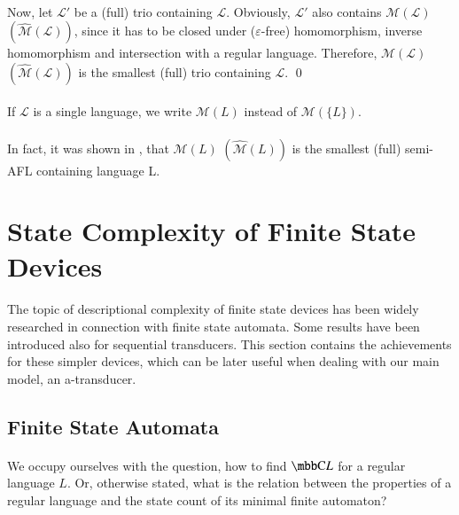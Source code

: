 \paragraph{}
Now, let $\mathcal{L'} $ be a (full) trio containing $\mathcal{L} $. Obviously, $\mathcal{L'} $ also contains $\mathcal{M(L)} $ $(\mathcal{\hat{M}(L)}) $, since it has to be closed under ($\varepsilon $-free) homomorphism, inverse homomorphism and intersection with a regular language. Therefore, $\mathcal{M(L)} $ $(\mathcal{\hat{M}(L)}) $ is the smallest (full) trio containing $\mathcal{L} $. \qed

\paragraph{}
\oznacenie If $\mathcal{L}$ is a single language, we write $\mathcal{M}(L)$ instead of $\mathcal{M}(\{ L\} )$.

\paragraph{}
In fact, it was shown in \cite{gingrei:pAFL}, that $\mathcal{M}(L) $ $(\mathcal{\hat{M}}(L)) $ is the smallest (full) semi-AFL containing language L.

\section{State Complexity of Finite State Devices}
\paragraph{}
The topic of descriptional complexity of finite state devices has been widely researched in connection with finite state automata. Some results have been introduced also for sequential transducers. This section contains the achievements for these simpler devices, which can be later useful when dealing with our main model, an a-transducer.

\subsection{Finite State Automata}
\paragraph{}
We occupy ourselves with the question, how to find $\C{L}$ for a regular language $L$. Or, otherwise stated, what is the relation between the properties of a regular language and the state count of its minimal finite automaton?


